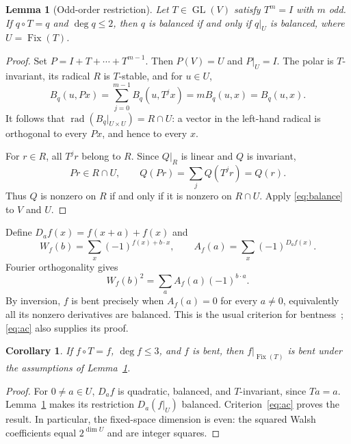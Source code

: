 \documentclass[11pt,a4paper]{article}
\newcommand{\rad}{\operatorname{rad}}
\newcommand{\Fix}{\operatorname{Fix}}
\newtheorem{corollary}[theorem]{Corollary}
\newtheorem{lemma}[theorem]{Lemma}
\begin{document}
\begin{lemma}[Odd-order restriction]\label{lem:odd}
Let $T\in\operatorname{GL}(V)$ satisfy $T^m=I$ with $m$ odd. If $q\circ T=q$ and $\deg q\le2$, then $q$ is balanced if and only if $q|_U$ is balanced, where $U=\Fix(T)$.
\end{lemma}
\begin{proof}
Set $P=I+T+\cdots+T^{m-1}$. Then $P(V)=U$ and $P|_U=I$. The polar is $T$-invariant, its radical $R$ is $T$-stable, and for $u\in U$,
\[
 B_q(u,Px)=\sum_{j=0}^{m-1}B_q(u,T^jx)
 =mB_q(u,x)=B_q(u,x).
\]
It follows that $\rad(B_q|_{U\times U})=R\cap U$: a vector in the left-hand radical is orthogonal to every $Px$, and hence to every $x$.

For $r\in R$, all $T^jr$ belong to $R$. Since $Q|_R$ is linear and $Q$ is invariant,
\[
 Pr\in R\cap U,\qquad Q(Pr)=\sum_jQ(T^jr)=Q(r).
\]
Thus $Q$ is nonzero on $R$ if and only if it is nonzero on $R\cap U$. Apply \eqref{eq:balance} to $V$ and $U$.
\end{proof}

Define $D_af(x)=f(x+a)+f(x)$ and
\[
 W_f(b)=\sum_x(-1)^{f(x)+b\cdot x},\qquad
 A_f(a)=\sum_x(-1)^{D_af(x)}.
\]
Fourier orthogonality gives
\begin{equation}\label{eq:ac}
 W_f(b)^2=\sum_a A_f(a)(-1)^{b\cdot a}.
\end{equation}
By inversion, $f$ is bent precisely when $A_f(a)=0$ for every $a\ne0$, equivalently all its nonzero derivatives are balanced. This is the usual criterion for bentness~\cite{rothaus}; \eqref{eq:ac} also supplies its proof.

\begin{corollary}\label{cor:transfer}
If $f\circ T=f$, $\deg f\le3$, and $f$ is bent, then $f|_{\Fix(T)}$ is bent under the assumptions of Lemma~\ref{lem:odd}.
\end{corollary}
\begin{proof}
For $0\ne a\in U$, $D_af$ is quadratic, balanced, and $T$-invariant, since $Ta=a$. Lemma~\ref{lem:odd} makes its restriction $D_a(f|_U)$ balanced. Criterion~\eqref{eq:ac} proves the result. In particular, the fixed-space dimension is even: the squared Walsh coefficients equal $2^{\dim U}$ and are integer squares.
\end{proof}
\end{document}
